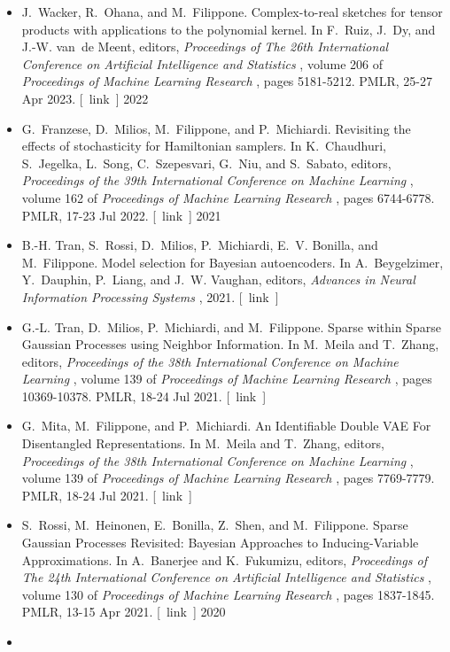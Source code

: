 \documentclass[10pt]{article}
\begin{document}
\begin{itemize}
\item 

  J. Wacker, R. Ohana, and M. Filippone. Complex-to-real sketches for tensor products with applications to the polynomial kernel. In F. Ruiz, J. Dy, and J.-W. van de Meent, editors, \emph{Proceedings of The 26th International Conference on Artificial Intelligence and Statistics}
, volume 206 of \emph{Proceedings of Machine Learning Research}
, pages 5181-5212. PMLR, 25-27 Apr 2023. [ link ] 
2022
\item 

  G. Franzese, D. Milios, M. Filippone, and P. Michiardi. Revisiting the effects of stochasticity for Hamiltonian samplers. In K. Chaudhuri, S. Jegelka, L. Song, C. Szepesvari, G. Niu, and S. Sabato, editors, \emph{Proceedings of the 39th International Conference on Machine Learning}
, volume 162 of \emph{Proceedings of Machine Learning Research}
, pages 6744-6778. PMLR, 17-23 Jul 2022. [ link ] 
2021
\item 

  B.-H. Tran, S. Rossi, D. Milios, P. Michiardi, E. V. Bonilla, and M. Filippone. Model selection for Bayesian autoencoders. In A. Beygelzimer, Y. Dauphin, P. Liang, and J. W. Vaughan, editors, \emph{Advances in Neural Information Processing Systems}
, 2021. [ link ] 

\item 

  G.-L. Tran, D. Milios, P. Michiardi, and M. Filippone. Sparse within Sparse Gaussian Processes using Neighbor Information. In M. Meila and T. Zhang, editors, \emph{Proceedings of the 38th International Conference on Machine Learning}
, volume 139 of \emph{Proceedings of Machine Learning Research}
, pages 10369-10378. PMLR, 18-24 Jul 2021. [ link ] 

\item 

  G. Mita, M. Filippone, and P. Michiardi. An Identifiable Double VAE For Disentangled Representations. In M. Meila and T. Zhang, editors, \emph{Proceedings of the 38th International Conference on Machine Learning}
, volume 139 of \emph{Proceedings of Machine Learning Research}
, pages 7769-7779. PMLR, 18-24 Jul 2021. [ link ] 

\item 

  S. Rossi, M. Heinonen, E. Bonilla, Z. Shen, and M. Filippone. Sparse Gaussian Processes Revisited: Bayesian Approaches to Inducing-Variable Approximations. In A. Banerjee and K. Fukumizu, editors, \emph{Proceedings of The 24th International Conference on Artificial Intelligence and Statistics}
, volume 130 of \emph{Proceedings of Machine Learning Research}
, pages 1837-1845. PMLR, 13-15 Apr 2021. [ link ] 
2020
\item 


\end{itemize}
\end{document}

